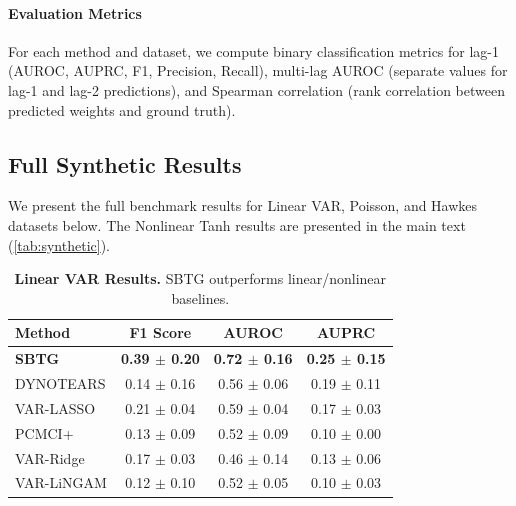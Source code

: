 \documentclass{article}
\theoremstyle{plain}
\theoremstyle{definition}
\theoremstyle{remark}
\newcommand{\1}{\mathbf{1}}
\begin{document}
\paragraph{Evaluation Metrics}

For each method and dataset, we compute binary classification metrics for lag-1 (AUROC, AUPRC, F1, Precision, Recall), multi-lag AUROC (separate values for lag-1 and lag-2 predictions), and Spearman correlation (rank correlation between predicted weights and ground truth).


\subsection{Full Synthetic Results}
\label{app:synthetic_full}

We present the full benchmark results for Linear VAR, Poisson, and Hawkes datasets below. The Nonlinear Tanh results are presented in the main text (\cref{tab:synthetic}).

\begin{table}[h!]
\centering
\caption{\textbf{Linear VAR Results.} SBTG outperforms linear/nonlinear baselines.}
\label{tab:res_var}
\begin{small}
\begin{tabular}{lccc}
\toprule
Method & F1 Score & AUROC & AUPRC \\
\midrule
\textbf{SBTG} & \textbf{0.39 $\pm$ 0.20} & \textbf{0.72 $\pm$ 0.16} & \textbf{0.25 $\pm$ 0.15} \\
DYNOTEARS & 0.14 $\pm$ 0.16 & 0.56 $\pm$ 0.06 & 0.19 $\pm$ 0.11 \\
VAR-LASSO & 0.21 $\pm$ 0.04 & 0.59 $\pm$ 0.04 & 0.17 $\pm$ 0.03 \\
PCMCI+ & 0.13 $\pm$ 0.09 & 0.52 $\pm$ 0.09 & 0.10 $\pm$ 0.00 \\
VAR-Ridge & 0.17 $\pm$ 0.03 & 0.46 $\pm$ 0.14 & 0.13 $\pm$ 0.06 \\
VAR-LiNGAM & 0.12 $\pm$ 0.10 & 0.52 $\pm$ 0.05 & 0.10 $\pm$ 0.03 \\
\bottomrule
\end{tabular}
\end{small}
\end{table}
\end{document}
